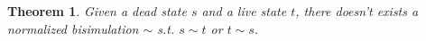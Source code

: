 \documentclass[acmsmall,screen]{acmart}
\newtheorem{theorem}{Theorem}
\DeclareMathOperator{\Img}{\mathrm{\mathbf{Img}}}
\begin{document}



\begin{theorem}
    Given a dead state \(s\) and a live state \(t\), there doesn't exists a normalized bisimulation \(∼\) s.t. \(s ∼ t\) or \(t ∼ s\).
\end{theorem}
\end{document}
